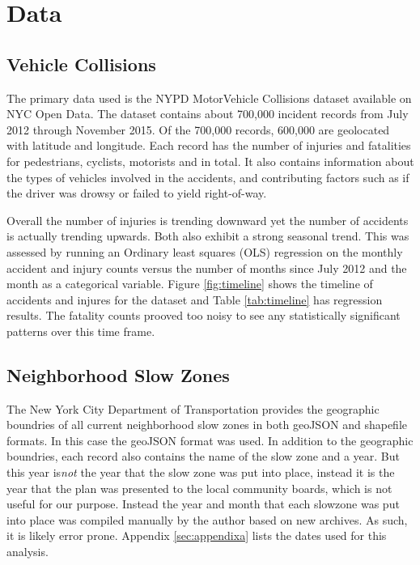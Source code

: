 \documentclass[10pt,journal,compsoc]{IEEEtran}
\begin{document}

\section{Data}

\subsection{Vehicle Collisions}

The primary data used is the NYPD MotorVehicle Collisions dataset available on NYC Open Data\cite{crashdata}.  The dataset contains about 700,000 incident records from July 2012 through November 2015.  Of the 700,000 records, 600,000 are geolocated with latitude and longitude.  Each record has the number of injuries and fatalities for pedestrians, cyclists, motorists and in total.  It also contains information about the types of vehicles involved in the accidents, and contributing factors such as if the driver was drowsy or failed to yield right-of-way.

Overall the number of injuries is trending downward yet the number of accidents is actually trending upwards. Both also exhibit a strong seasonal trend. This was assessed by running an Ordinary least squares (OLS) regression on the monthly accident and injury counts versus the number of months since July 2012 and the month as a categorical variable. Figure \ref{fig:timeline} shows the timeline of accidents and injures for the dataset and Table \ref{tab:timeline} has regression results. The fatality counts prooved too noisy to see any statistically significant patterns over this time frame.



\subsection{Neighborhood Slow Zones}

The New York City Department of Transportation provides the geographic boundries of all current neighborhood slow zones in both geoJSON and shapefile formats\cite{slowzones}.  In this case the geoJSON format was used.  In addition to the geographic boundries, each record also contains the name of the slow zone and a year.  But this year is\textit{not} the year that the slow zone was put into place, instead it is the year that the plan was presented to the local community boards, which is not useful for our purpose.  Instead the year and month that each slowzone was put into place was compiled manually by the author based on new archives.  As such, it is likely error prone.  Appendix \ref{sec:appendixa} lists the dates used for this analysis.
\end{document}

